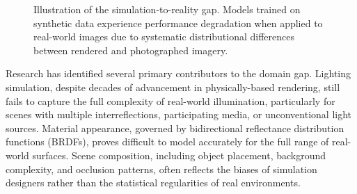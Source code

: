 \begin{figure}[t]
\centering
{}
\caption{Illustration of the simulation-to-reality gap. Models trained on synthetic data experience performance degradation when applied to real-world images due to systematic distributional differences between rendered and photographed imagery.}
\label{fig:sim_to_real_gap}
\end{figure}

Research has identified several primary contributors to the domain gap. Lighting simulation, despite decades of advancement in physically-based rendering, still fails to capture the full complexity of real-world illumination, particularly for scenes with multiple interreflections, participating media, or unconventional light sources. Material appearance, governed by bidirectional reflectance distribution functions (BRDFs), proves difficult to model accurately for the full range of real-world surfaces. Scene composition, including object placement, background complexity, and occlusion patterns, often reflects the biases of simulation designers rather than the statistical regularities of real environments.

